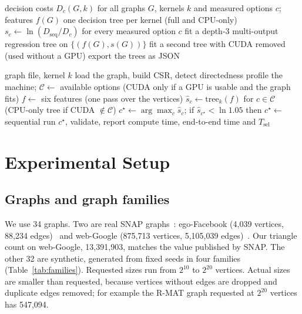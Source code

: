 \documentclass[conference]{IEEEtran}
\begin{document}
\begin{algorithm}[!tb]
\caption{Offline training (once per machine)}\label{alg:train}
\begin{algorithmic}[1]
\Require decision costs $D_c(G,k)$ for all graphs $G$, kernels $k$ and measured options $c$; features $f(G)$
\Ensure one decision tree per kernel (full and CPU-only)
    \State $s_c \gets \ln(D_{\text{seq}}/D_c)$ for every measured option $c$
  \EndFor
  \State fit a depth-3 multi-output regression tree on $\{(f(G),s(G))\}$
  \State fit a second tree with CUDA removed (used without a GPU)
\EndFor
\State export the trees as JSON
\end{algorithmic}
\end{algorithm}

\begin{algorithm}[!tb]
\caption{Selection and execution of one query}\label{alg:select}
\begin{algorithmic}[1]
\Require graph file, kernel $k$
\State load the graph, build CSR, detect directedness
\State profile the machine; $\mathcal{C}\gets$ available options (CUDA only if a GPU is usable and the graph fits)
\State $f\gets$ six features (one pass over the vertices)
\State $\hat s_c\gets \text{tree}_k(f)$ for $c\in\mathcal{C}$ (CPU-only tree if CUDA $\notin\mathcal{C}$)
\State $c^\star\gets\arg\max_c \hat s_c$; if $\hat s_{c^\star}<\ln 1.05$ then $c^\star\gets$ sequential
\State run $c^\star$, validate, report compute time, end-to-end time and $T_{\text{sel}}$
\end{algorithmic}
\end{algorithm}

\section{Experimental Setup}
\subsection{Graphs and graph families}
We use 34 graphs. Two are real SNAP graphs~\cite{snap}: ego-Facebook (4,039 vertices, 88,234 edges)~\cite{mcauley} and web-Google (875,713 vertices, 5,105,039 edges)~\cite{leskovec}. Our triangle count on web-Google, 13,391,903, matches the value published by SNAP. The other 32 are synthetic, generated from fixed seeds in four families (Table~\ref{tab:families}). Requested sizes run from $2^{10}$ to $2^{20}$ vertices. Actual sizes are smaller than requested, because vertices without edges are dropped and duplicate edges removed; for example the R-MAT graph requested at $2^{20}$ vertices has 547,094.
\end{document}
